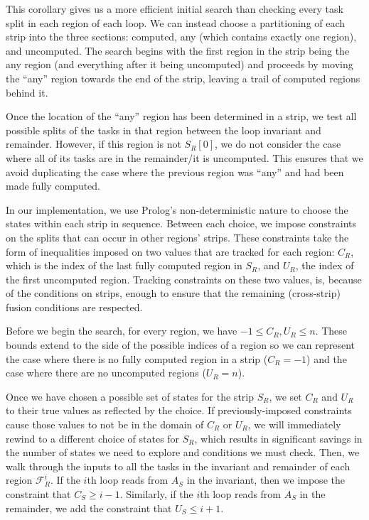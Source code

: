 \documentclass[12pt,letterpaper]{article}
\newcommand*{\opF}{\mathcal{F}}
\begin{document}
This corollary gives us a more efficient initial search than checking every task split in each region of each loop.
We can instead choose a partitioning of each strip into the three sections: computed, any (which contains exactly one region), and uncomputed.
The search begins with the first region in the strip being the any region (and everything after it being uncomputed) and proceeds by moving the ``any'' region towards the end of the strip, leaving a trail of computed regions behind it.

Once the location of the ``any'' region has been determined in a strip, we test all possible splits of the tasks in that region between the loop invariant and remainder.
However, if this region is not $S_R[0]$, we do not consider the case where all of its tasks are in the remainder/it is uncomputed.
This ensures that we avoid duplicating the case where the previous region was ``any'' and had been made fully computed.

In our implementation, we use Prolog's non-deterministic nature to choose the states within each strip in sequence.
Between each choice, we impose constraints on the splits that can occur in other regions' strips.
These constraints take the form of inequalities imposed on two values that are tracked for each region: $C_R$, which is the index of the last fully computed region in $S_R$, and $U_R$, the index of the first uncomputed region.
Tracking constraints on these two values, is, because of the conditions on strips, enough to ensure that the remaining (cross-strip) fusion conditions are respected.

Before we begin the search, for every region, we have $-1 \leq C_R, U_R \leq n$.
These bounds extend to the side of the possible indices of a region so we can represent the case where there is no fully computed region in a strip ($C_R = -1$) and the case where there are no uncomputed regions ($U_R = n$).

Once we have chosen a possible set of states for the strip $S_R$, we set $C_R$ and $U_R$ to their true values as reflected by the choice.
If previously-imposed constraints cause those values to not be in the domain of $C_R$ or $U_R$, we will immediately rewind to a different choice of states for $S_R$, which results in significant savings in the number of states we need to explore and conditions we must check.
Then, we walk through the inputs to all the tasks in the invariant and remainder of each region $\opF_R^i$.
If the $i$th loop reads from $A_S$ in the invariant, then we impose the constraint that $C_S \geq i - 1$.
Similarly, if the $i$th loop reads from $A_S$ in the remainder, we add the constraint that $U_S \leq i + 1$.
\end{document}
